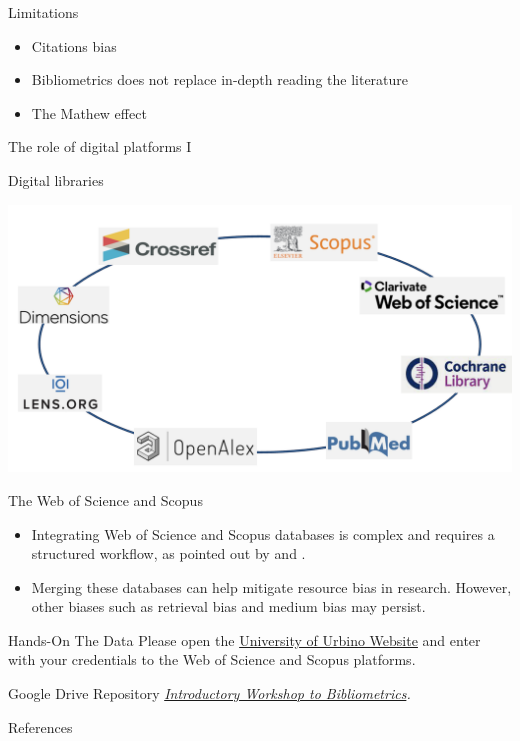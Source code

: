 \documentclass[
  ignorenonframetext,
]{beamer}
\newif\ifbibliography
\begin{document}
\begin{frame}{Limitations}
\protect\hypertarget{limitations}{}
\begin{itemize}
\item
  Citations bias
\item
  Bibliometrics does not replace in-depth reading the literature
\item
  The Mathew effect
\end{itemize}
\end{frame}

\begin{frame}{The role of digital platforms I}
\protect\hypertarget{the-role-of-digital-platforms-i}{}
\begin{block}{Digital libraries}
\protect\hypertarget{digital-libraries}{}
\begin{center}
\includegraphics[width=1\textwidth]{pic_4.png}
\end{center}
\end{block}
\end{frame}

\begin{frame}{The Web of Science and Scopus}
\protect\hypertarget{the-web-of-science-and-scopus}{}
\begin{itemize}
\item
  Integrating Web of Science and Scopus databases is complex and
  requires a structured workflow, as pointed out by
  \citet{echchakoui2020} and \citet{caputo2022}.
\item
  Merging these databases can help mitigate resource bias in research.
  However, other biases such as retrieval bias and medium bias may
  persist.
\end{itemize}
\end{frame}

\begin{frame}{Hands-On The Data}
\protect\hypertarget{hands-on-the-data}{}
Please open the \href{https://www.uniurb.it/}{University of Urbino
Website} and enter with your credentials to the Web of Science and
Scopus platforms.

Google Drive Repository
\href{https://drive.google.com/drive/folders/1Mw6cWYZZxRlZTQAUYZofifyY_xkmcVeK}{\emph{Introductory
Workshop to Bibliometrics}}\emph{.}
\end{frame}

\renewcommand\refname{References}
\begin{frame}[allowframebreaks]{References}
  \bibliographytrue
  
\end{frame}
\end{document}
